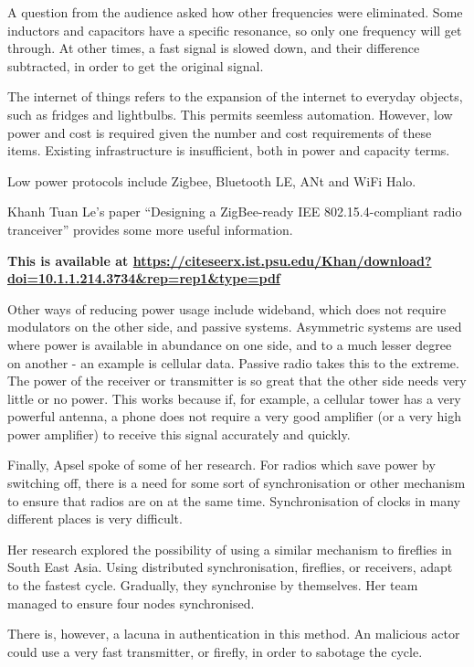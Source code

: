 		A question from the audience asked how other frequencies were eliminated. Some inductors and capacitors have a specific resonance, so only one frequency will get through. At other times, a fast signal is slowed down, and their difference subtracted, in order to get the original signal.

		The internet of things refers to the expansion of the internet to everyday objects, such as fridges and lightbulbs. This permits seemless automation. However, low power and cost is required given the number and cost requirements of these items. Existing infrastructure is insufficient, both in power and capacity terms.

		Low power protocols include Zigbee, Bluetooth LE, ANt and WiFi Halo.

		Khanh Tuan Le's paper ``Designing a ZigBee-ready IEE 802.15.4-compliant radio tranceiver'' provides some more useful information.

		\textbf{This is available at \url{https://citeseerx.ist.psu.edu/Khan/download?doi=10.1.1.214.3734&rep=rep1&type=pdf}}

		Other ways of reducing power usage include wideband, which does not require modulators on the other side, and passive systems. Asymmetric systems are used where power is available in abundance on one side, and to a much lesser degree on another - an example is cellular data. Passive radio takes this to the extreme. The power of the receiver or transmitter is so great that the other side needs very little or no power. This works because if, for example, a cellular tower has a very powerful antenna, a phone does not require a very good amplifier (or a very high power amplifier) to receive this signal accurately and quickly.

		Finally, Apsel spoke of some of her research. For radios which save power by switching off, there is a need for some sort of synchronisation or other mechanism to ensure that radios are on at the same time. Synchronisation of clocks in many different places is very difficult.

		Her research explored the possibility of using a similar mechanism to fireflies in South East Asia. Using distributed synchronisation, fireflies, or receivers, adapt to the fastest cycle. Gradually, they synchronise by themselves. Her team managed to ensure four nodes synchronised.

		There is, however, a lacuna in authentication in this method. An malicious actor could use a very fast transmitter, or firefly, in order to sabotage the cycle.

